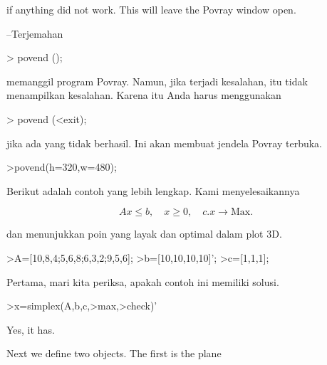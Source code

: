 \documentclass[a4paper,10pt]{article}
\begin{document}
\begin{eulernotebook}
\begin{eulercomment}
\begin{eulercomment}
\begin{eulercomment}
if anything did not work. This will leave the Povray window open.

--Terjemahan

\textgreater{} povend ();

memanggil program Povray. Namun, jika terjadi kesalahan, itu tidak
menampilkan kesalahan. Karena itu Anda harus menggunakan

\end{eulercomment}
\begin{eulerttcomment}
 > povend (<exit);
\end{eulerttcomment}
\begin{eulercomment}

jika ada yang tidak berhasil. Ini akan membuat jendela Povray terbuka.
\end{eulercomment}
\begin{eulerprompt}
>povend(h=320,w=480);
\end{eulerprompt}
\begin{eulercomment}
Berikut adalah contoh yang lebih lengkap. Kami menyelesaikannya

\end{eulercomment}
\begin{eulerformula}
\[
Ax \le b, \quad x \ge 0, \quad c.x \to \text{Max.}
\]
\end{eulerformula}
\begin{eulercomment}
dan menunjukkan poin yang layak dan optimal dalam plot 3D.
\end{eulercomment}
\begin{eulerprompt}
>A=[10,8,4;5,6,8;6,3,2;9,5,6];
>b=[10,10,10,10]';
>c=[1,1,1];
\end{eulerprompt}
\begin{eulercomment}
Pertama, mari kita periksa, apakah contoh ini memiliki solusi.
\end{eulercomment}
\begin{eulerprompt}
>x=simplex(A,b,c,>max,>check)'
\end{eulerprompt}
\begin{euleroutput}
  [0,  1,  0.5]
\end{euleroutput}
\begin{eulercomment}
Yes, it has.

Next we define two objects. The first is the plane


\end{eulercomment}
\end{eulercomment}
\end{eulercomment}
\end{eulernotebook}
\end{document}
